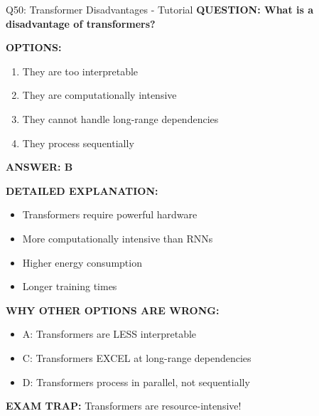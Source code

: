 \documentclass[8pt]{beamer}
\begin{document}
	\begin{frame}{Q50: Transformer Disadvantages - Tutorial}
		\fontsize{6.5}{7.5}\selectfont
		\textbf{QUESTION: What is a disadvantage of transformers?}
		
		\vspace{0.1cm}
		\textbf{OPTIONS:}
		\begin{enumerate}
			\item They are too interpretable
			\item They are computationally intensive
			\item They cannot handle long-range dependencies
			\item They process sequentially
		\end{enumerate}
		
		\vspace{0.1cm}
		\textcolor{myblue}{\textbf{ANSWER: B}}
		
		\vspace{0.1cm}
		\textbf{DETAILED EXPLANATION:}
		\begin{itemize}
			\item Transformers require powerful hardware
			\item More computationally intensive than RNNs
			\item Higher energy consumption
			\item Longer training times
		\end{itemize}
		
		\vspace{0.1cm}
		\textcolor{myred}{\textbf{WHY OTHER OPTIONS ARE WRONG:}}
		\begin{itemize}
			\item \textcolor{myred}{A:} Transformers are LESS interpretable
			\item \textcolor{myred}{C:} Transformers EXCEL at long-range dependencies
			\item \textcolor{myred}{D:} Transformers process in parallel, not sequentially
		\end{itemize}
		
		\textcolor{myred}{\textbf{EXAM TRAP:}} Transformers are \textcolor{myblue}{resource-intensive}!
	\end{frame}
	
	
\end{document}
